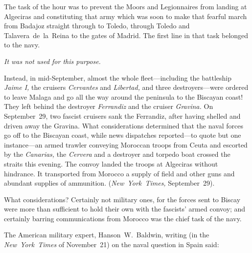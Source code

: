 The task of the hour was to prevent the Moors and Legionnaires from landing at Algeciras and constituting that army which was soon to make that fearful march from Badajoz straight through to Toledo, through Toledo and Talavera~de~la~Reina to the gates of Madrid. The first line in that task belonged to the navy.

\smallskip

\emph{It was not used for this purpose.}

\smallskip

Instead, in mid-September, almost the whole fleet---including the battleship \emph{Jaime I,} the cruisers \emph{Cervantes} and \emph{Libertad,} and three destroyers---were ordered to leave Malaga and go all the way around the peninsula to the Biscayan coast! They left behind the destroyer \emph{Ferrandiz} and the cruiser \emph{Gravina.} On September~29, two fascist cruisers sank the Ferrandiz, after having shelled and driven away the Gravina. What considerations determined that the naval forces go off to the Biscayan coast, while news dispatches reported---to quote but one instance---an armed trawler conveying Moroccan troops from Ceuta and escorted by the \emph{Canarias,} the \emph{Cervera} and a destroyer and torpedo boat crossed the straits this evening. The convoy landed the troops at Algeciras without hindrance. It transported from Morocco a supply of field and other guns and abundant supplies of ammunition. (\emph{New~York~Times,} September~29).

What considerations? Certainly not military ones, for the forces sent to Biscay were more than sufficient to hold their own with the fascists’ armed convoy; and certainly barring communications from Morocco was the chief task of the navy.

The American military expert, Hanson~W.~Baldwin, writing (in the \emph{New~York~Times} of November~21) on the naval question in Spain said:

